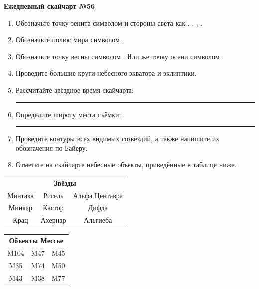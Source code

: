 \documentclass{./SAS-class-skygen}
\begin{document}
    
    
    
	\begin{center}
		\large\textbf{Ежедневный скайчарт №56}
	\end{center}

	\begin{enumerate}
		\item Обозначьте точку зенита символом  и стороны света как , , , .
		\item Обозначьте полюс мира символом .
		\item Обозначьте точку весны символом \Aries. Или же точку осени символом \Libra.
		\item Проведите большие круги небесного экватора и эклиптики.
		\item Рассчитайте звёздное время скайчарта: \rule{2cm}{0.4pt}
		\item Определите широту места съёмки: \rule{2cm}{0.4pt}
		\item Проведите контуры всех видимых созвездий, а также напишите их обозначения по Байеру.
		\item Отметьте на скайчарте небесные объекты, приведённые в таблице ниже.
	\end{enumerate}
	
    \vspace{0.5cm}

    \begin{table}[h!]
    \centering
    \begin{tabular}{ccc}
    \multicolumn{3}{c}{\textbf{Звёзды}} \\ Минтака & Ригель & Альфа Центавра \\
Минкар & Кастор & Дифда \\
Крац & Ахернар & Альгиеба \\

\end{tabular}
    \hfill
    \begin{tabular}{ccc}
    \multicolumn{3}{c}{\textbf{Объекты Мессье}} \\ M104 & M47 & M45 \\
M35 & M74 & M50 \\
M43 & M38 & M77 \\

\end{tabular}
    \end{table}
	
\end{document}
